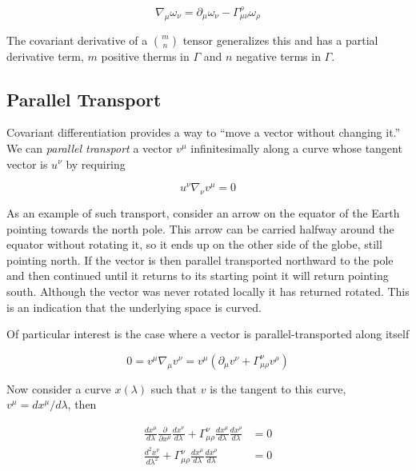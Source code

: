 \begin{equation*}
\nabla_\mu \omega_\nu = \partial_\mu \omega_\nu - 
\Gamma^\rho_{\mu\nu} \omega_\rho
\end{equation*}

The covariant derivative of a ${m \choose n}$ tensor generalizes this
and has a partial derivative term, $m$ positive therms in $\Gamma$ and
$n$ negative terms in $\Gamma$.

\subsection{Parallel Transport}
\label{ssec:parallel}

Covariant differentiation provides a way to ``move a vector without
changing it.''  We can \emph{parallel transport} a vector $v^\mu$
infinitesimally along a curve whose tangent vector is $u^\nu$ by
requiring

\begin{equation*}
u^\nu \nabla_\nu v^\mu = 0
\end{equation*}

As an example of such transport, consider an arrow on the equator of
the Earth pointing towards the north pole.  This arrow can be carried
halfway around the equator without rotating it, so it ends up on the
other side of the globe, still pointing north.  If the vector is then
parallel transported northward to the pole and then continued until it
returns to its starting point it will return pointing south.  Although
the vector was never rotated locally it has returned rotated.  This is
an indication that the underlying space is curved.

Of particular interest is the case where a vector is
parallel-transported along itself

\begin{equation*}
0 = v^\mu \nabla_\mu v^\nu 
= v^\mu (\partial_\mu v^\nu + \Gamma^\nu_{\mu\rho} v^\rho)
\end{equation*}

Now consider a curve $x(\lambda)$ such that $v$ is the tangent to this
curve, $v^\mu = d x^\mu/d\lambda$, then

\begin{align}
\label{eq:geodesic}
\frac{d x^\mu}{d\lambda}
  \frac{\partial }{\partial x^\mu}
  \frac{d x^\nu}{d\lambda}  
+ \Gamma^\nu_{\mu\rho} 
\frac{d x^\mu}{d\lambda}
\frac{d x^\rho}{d\lambda} &= 0 \nonumber \\
\frac{d^2 x^\nu}{d\lambda^2}
+ \Gamma^\nu_{\mu\rho} 
\frac{d x^\mu}{d\lambda}
\frac{d x^\rho}{d\lambda} &= 0 \nonumber \\
\end{align}

